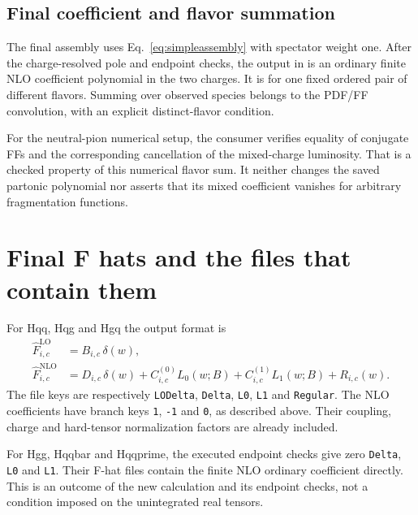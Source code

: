 \documentclass[11pt,a4paper]{article}
\newcommand{\Fhat}{\widehat F}
\newcommand{\NLO}{\mathrm{NLO}}
\newcommand{\LO}{\mathrm{LO}}
\begin{document}
\subsection{Final coefficient and flavor summation}

The final assembly uses Eq.~\eqref{eq:simpleassembly} with spectator
weight one. After the charge-resolved pole and endpoint checks, the
output in  is an ordinary finite NLO
coefficient polynomial in the two charges. It is for one fixed ordered
pair of different flavors. Summing over observed species belongs to the
PDF/FF convolution, with an explicit distinct-flavor condition.

For the neutral-pion numerical setup, the consumer verifies equality of
conjugate FFs and the corresponding cancellation of the mixed-charge
luminosity. That is a checked property of this numerical flavor sum.
It neither changes the saved partonic polynomial nor asserts that its
mixed coefficient vanishes for arbitrary fragmentation functions.

\section{Final F hats and the files that contain them}

For Hqq, Hqg and Hgq the output format is
\begin{align}
 \Fhat_{i,c}^{\LO}&=B_{i,c}\,\delta(w),\\
 \Fhat_{i,c}^{\NLO}
 &=D_{i,c}\,\delta(w)+C_{i,c}^{(0)}L_0(w;B)
                  +C_{i,c}^{(1)}L_1(w;B)+R_{i,c}(w).
 \label{eq:finalformat}
\end{align}
The file keys are respectively \texttt{LODelta}, \texttt{Delta},
\texttt{L0}, \texttt{L1} and \texttt{Regular}. The NLO coefficients have
branch keys \texttt{1}, \texttt{-1} and \texttt{0}, as described above.
Their coupling, charge and hard-tensor normalization factors are already
included.

For Hgg, Hqqbar and Hqqprime, the executed endpoint checks give zero
\texttt{Delta}, \texttt{L0} and \texttt{L1}. Their F-hat files contain
the finite NLO ordinary coefficient directly. This is an outcome of the
new calculation and its endpoint checks, not a condition imposed on the
unintegrated real tensors.
\end{document}
